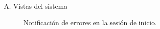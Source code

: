 \begin{annexes}{A. Vistas del sistema}
\begin{figure}[!ht]
        \caption{Notificación de errores en la sesión de inicio.}
        \label{annex: 1}
    \end{figure}


\end{annexes}
